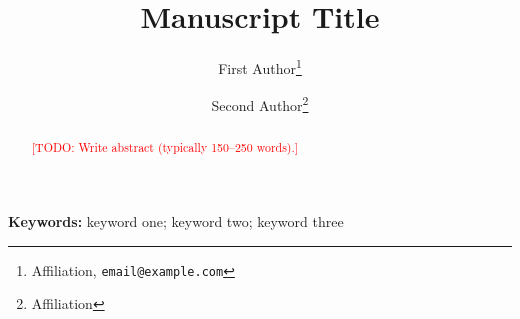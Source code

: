 \documentclass[11pt]{article}
\title{Manuscript Title}
\author{%
  First Author\thanks{Affiliation, \texttt{email@example.com}} \and
  Second Author\thanks{Affiliation}%
}
\date{}
\newcommand{\todo}[1]{\textcolor{red}{[TODO: #1]}}
\begin{document}
\maketitle

\begin{abstract}
\todo{Write abstract (typically 150--250 words).}
\end{abstract}

\noindent\textbf{Keywords:} keyword one; keyword two; keyword three








%
  {}%
  {}
\end{document}
